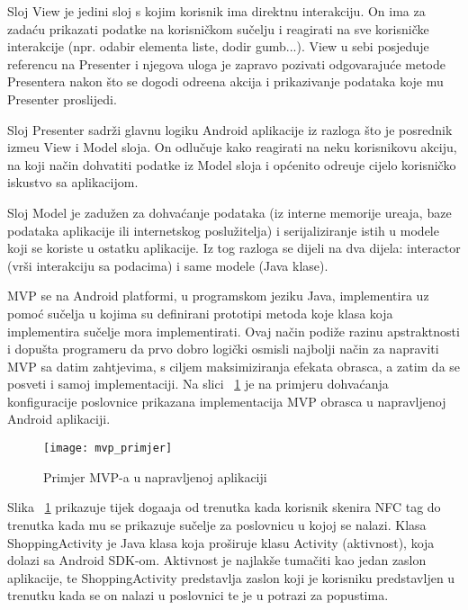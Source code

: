 Sloj View je jedini sloj s kojim korisnik ima direktnu interakciju. On ima za zada\'{c}u prikazati podatke na korisni\v{c}kom su\v{c}elju i reagirati na sve korisni\v{c}ke interakcije (npr. odabir elementa liste, dodir gumb...). View u sebi posjeduje referencu na Presenter i njegova uloga je zapravo pozivati odgovaraju\'{c}e metode Presentera nakon \v{s}to se dogodi odre\dj ena akcija i prikazivanje podataka koje mu Presenter proslijedi.

Sloj Presenter sadr\v{z}i glavnu logiku Android aplikacije iz razloga \v{s}to je posrednik izme\dj u View i Model sloja. On odlu\v{c}uje kako reagirati na neku korisnikovu akciju, na koji na\v{c}in dohvatiti podatke iz Model sloja i op\'{c}enito odre\dj uje cijelo korisni\v{c}ko iskustvo sa aplikacijom.

Sloj Model je zadu\v{z}en za dohva\'{c}anje podataka (iz interne memorije ure\dj aja, baze podataka aplikacije ili internetskog poslu\v{z}itelja) i serijaliziranje istih u modele koji se koriste u ostatku aplikacije. Iz tog razloga se dijeli na dva dijela: interactor (vr\v{s}i interakciju sa podacima) i same modele (Java klase).

MVP se na Android platformi, u programskom jeziku Java, implementira uz pomo\'{c} su\v{c}elja u kojima su definirani prototipi metoda koje klasa koja implementira su\v{c}elje mora implementirati. Ovaj na\v{c}in podi\v{z}e razinu apstraktnosti i dopu\v{s}ta programeru da prvo dobro logi\v{c}ki osmisli najbolji na\v{c}in za napraviti MVP sa datim zahtjevima, s ciljem maksimiziranja efekata obrasca, a zatim da se posveti i samoj implementaciji. Na slici ~\ref{fig:mvp} je na primjeru dohva\'{c}anja konfiguracije poslovnice prikazana implementacija MVP obrasca u napravljenoj Android aplikaciji.


\begin{figure}[!htbp]
	\begin{center}
 \texttt{[image: mvp\_primjer]}
 \caption{Primjer MVP-a u napravljenoj aplikaciji}
 \label{fig:mvp}
	\end{center}
\end{figure}

Slika ~\ref{fig:mvp} prikazuje tijek doga\dj aja od trenutka kada korisnik skenira NFC tag do trenutka kada mu se prikazuje su\v{c}elje za poslovnicu u kojoj se nalazi. Klasa ShoppingActivity je Java klasa koja pro\v{s}iruje klasu Activity (aktivnost), koja dolazi sa Android SDK-om. Aktivnost je najlak\v{s}e tuma\v{c}iti kao jedan zaslon aplikacije, te ShoppingActivity predstavlja zaslon koji je korisniku predstavljen u trenutku kada se on nalazi u poslovnici te je u potrazi za popustima.

